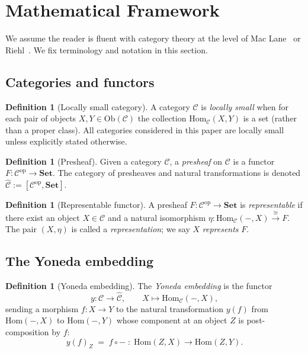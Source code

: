 \documentclass[12pt]{article}
\theoremstyle{definition}
\newtheorem{definition}[theorem]{Definition}
\theoremstyle{remark}
\begin{document}
\section{Mathematical Framework}
\label{sec:framework}

We assume the reader is fluent with category theory at the level of Mac Lane~\cite{maclane} or Riehl~\cite{riehl}. We fix terminology and notation in this section.

\subsection{Categories and functors}

\begin{definition}[Locally small category]
\label{def:locally-small}
A category $\mathcal{C}$ is \emph{locally small} when for each pair of objects $X, Y \in \mathrm{Ob}(\mathcal{C})$ the collection $\mathrm{Hom}_{\mathcal{C}}(X, Y)$ is a set (rather than a proper class). All categories considered in this paper are locally small unless explicitly stated otherwise.
\end{definition}

\begin{definition}[Presheaf]
\label{def:presheaf}
Given a category $\mathcal{C}$, a \emph{presheaf} on $\mathcal{C}$ is a functor $F\colon \mathcal{C}^{\mathrm{op}} \to \mathbf{Set}$. The category of presheaves and natural transformations is denoted $\widehat{\mathcal{C}} := [\mathcal{C}^{\mathrm{op}}, \mathbf{Set}]$.
\end{definition}

\begin{definition}[Representable functor]
\label{def:representable}
A presheaf $F\colon \mathcal{C}^{\mathrm{op}} \to \mathbf{Set}$ is \emph{representable} if there exist an object $X \in \mathcal{C}$ and a natural isomorphism $\eta\colon \mathrm{Hom}_{\mathcal{C}}(-, X) \xrightarrow{\;\cong\;} F$. The pair $(X, \eta)$ is called a \emph{representation}; we say $X$ \emph{represents} $F$.
\end{definition}

\subsection{The Yoneda embedding}

\begin{definition}[Yoneda embedding]
\label{def:yoneda-embedding}
The \emph{Yoneda embedding} is the functor
\[
y\colon \mathcal{C} \longrightarrow \widehat{\mathcal{C}},\qquad
X \longmapsto \mathrm{Hom}_{\mathcal{C}}(-, X),
\]
sending a morphism $f\colon X \to Y$ to the natural transformation $y(f)$ from $\mathrm{Hom}(-, X)$ to $\mathrm{Hom}(-, Y)$ whose component at an object $Z$ is post-composition by $f$:
\[
y(f)_Z \;=\; f \circ -\;\colon\; \mathrm{Hom}(Z, X) \longrightarrow \mathrm{Hom}(Z, Y).
\]
\end{definition}
\end{document}

